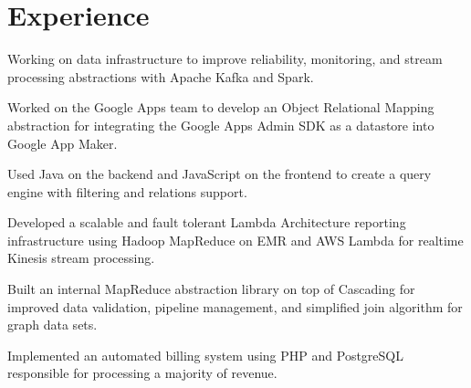 \documentclass[]{resume}
\begin{document}
\begin{minipage}[t]{0.66\textwidth}


\section{Experience}

\vspace{\topsep} %
\begin{tightemize}
\item Working on data infrastructure to improve reliability, monitoring, and
stream processing abstractions with Apache Kafka and Spark.
\end{tightemize}
\sectionsep

\begin{tightemize}
\item Worked on the Google Apps team to develop an Object Relational Mapping
abstraction for integrating the Google Apps Admin SDK as a datastore into
Google App Maker.
\item Used Java on the backend and JavaScript on the frontend to create a query
engine with filtering and relations support.
\end{tightemize}
\sectionsep

\begin{tightemize}
\item Developed a scalable and fault tolerant Lambda Architecture reporting
infrastructure using Hadoop MapReduce on EMR and AWS Lambda for realtime
Kinesis stream processing.
\item Built an internal MapReduce abstraction library on top of Cascading for
improved data validation, pipeline management, and simplified join algorithm
for graph data sets.
\item Implemented an automated billing system using PHP and PostgreSQL
responsible for processing a majority of revenue.
\end{tightemize}
\sectionsep



\end{minipage}
\end{document}
